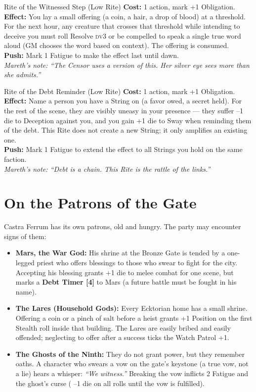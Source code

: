 \documentclass[10pt,twoside]{book}
\newcommand{\dv}{\textsc{dv}}
\begin{document}
\begin{sidebar}{Rite of the Witnessed Step (Low Rite)}
\textbf{Cost:} 1 action, mark +1 Obligation. \\
\textbf{Effect:} You lay a small offering (a coin, a hair, a drop of blood) at a threshold. For the next hour, any creature that crosses that threshold while intending to deceive you must roll Resolve \dv 3 or be compelled to speak a single true word aloud (GM chooses the word based on context). The offering is consumed. \\
\textbf{Push:} Mark 1 Fatigue to make the effect last until dawn. \\
\textit{Mareth's note: ``The Censor uses a version of this. Her silver eye sees more than she admits.''}
\end{sidebar}

\begin{sidebar}{Rite of the Debt Reminder (Low Rite)}
\textbf{Cost:} 1 action, mark +1 Obligation. \\
\textbf{Effect:} Name a person you have a String on (a favor owed, a secret held). For the rest of the scene, they are visibly uneasy in your presence --- they suffer --1 die to Deception against you, and you gain +1 die to Sway when reminding them of the debt. This Rite does not create a new String; it only amplifies an existing one. \\
\textbf{Push:} Mark 1 Fatigue to extend the effect to all Strings you hold on the same faction. \\
\textit{Mareth's note: ``Debt is a chain. This Rite is the rattle of the links.''}
\end{sidebar}

\section*{On the Patrons of the Gate}

Castra Ferrum has its own patrons, old and hungry. The party may encounter signs of them:

\begin{itemize}
\item \textbf{Mars, the War God:} His shrine at the Bronze Gate is tended by a one-legged priest who offers blessings to those who swear to fight for the city. Accepting his blessing grants +1 die to melee combat for one scene, but marks a \textbf{Debt Timer [4]} to Mars (a future battle must be fought in his name).
\item \textbf{The Lares (Household Gods):} Every Ecktorian home has a small shrine. Offering a coin or a pinch of salt before a heist grants +1 Position on the first Stealth roll inside that building. The Lares are easily bribed and easily offended; neglecting to offer after a success ticks the Watch Patrol +1.
\item \textbf{The Ghosts of the Ninth:} They do not grant power, but they remember oaths. A character who swears a vow on the gate's keystone (a true vow, not a lie) hears a whisper: \textit{``We witness.''} Breaking the vow inflicts 2 Fatigue and the ghost's curse ( --1 die on all rolls until the vow is fulfilled).
\end{itemize}
\end{document}
